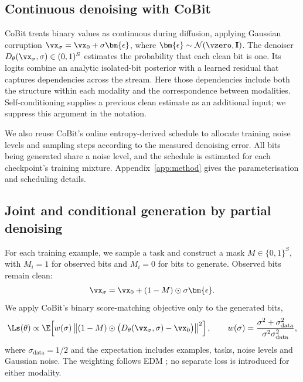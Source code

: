 \subsection{Continuous denoising with CoBit}
\label{sec:method:cobit}

CoBit treats binary values as continuous during diffusion, applying Gaussian corruption
$\vx_\sigma=\vx_0+\sigma\bm{\epsilon}$, where
$\bm{\epsilon}\sim\mathcal N(\vzero,\mathbf I)$.
The denoiser $D_\theta(\vx_\sigma,\sigma)\in(0,1)^S$ estimates the probability that each
clean bit is one. Its logits combine an analytic isolated-bit posterior with a learned residual
that captures dependencies across the stream. Here those dependencies include both the structure
within each modality and the correspondence between modalities. Self-conditioning supplies a
previous clean estimate as an additional input; we suppress this argument in the notation.

We also reuse CoBit's online entropy-derived schedule to allocate training noise levels and
sampling steps according to the measured denoising error. All bits being generated share a
noise level, and the schedule is estimated for each checkpoint's training mixture.
Appendix~\ref{app:method} gives the parameterisation and scheduling details.

\subsection{Joint and conditional generation by partial denoising}
\label{sec:method:directions}

For each training example, we sample a task and construct a mask $M\in\{0,1\}^{S}$, with
$M_i=1$ for observed bits and $M_i=0$ for bits to generate. Observed bits remain clean:
\begin{equation}
\vx_\sigma=\vx_0+(1-M)\odot\sigma\bm{\epsilon}.
\label{eq:partial-denoising}
\end{equation}
We apply CoBit's binary score-matching objective only to the generated bits,
\begin{equation}
\Ls(\theta)\propto
\E\!\left[w(\sigma)
\left\|(1-M)\odot\bigl(D_\theta(\vx_\sigma,\sigma)-\vx_0\bigr)\right\|^2\right],
\qquad
w(\sigma)=\frac{\sigma^2+\sigma_{\mathrm{data}}^2}
{\sigma^2\sigma_{\mathrm{data}}^2},
\label{eq:loss}
\end{equation}
where $\sigma_{\mathrm{data}}=1/2$ and the expectation includes examples, tasks, noise levels
and Gaussian noise. The weighting follows EDM \citep{image:edm}; no separate loss is introduced for either modality.

